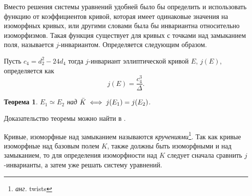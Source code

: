 \documentclass[12pt]{article}
\newtheorem{theorem}{Теорема}
\theoremstyle{definition}
\theoremstyle{definition}
\theoremstyle{definition}
\begin{document}
Вместо решения системы уравнений удобней было бы определить и использовать функцию от коэффициентов кривой, которая имеет одинаковые значения на изоморфных кривых, или другими словами была бы инвариантна относительно изоморфизмов. Такая функция существует для кривых с точками над замыканием поля, называется $j$-инвариантом. Определяется следующим образом.

Пусть $c_4 = d_2^2 - 24 d_4$ тогда $j$-инвариант эллиптической кривой $E$, $j(E)$, определяется как 
\[
j(E) = \frac{c_4^3}{\Delta}.
\]

\begin{theorem}
	$E_1 \simeq E_2$ над $\Bar{K} \iff j(E_1)=j(E_2)$.
\end{theorem}
Доказательство теоремы можно найти в \cite[46]{Silverman2009}.
%	
%	
%	
%	
%	

Кривые, изоморфные над замыканием называются \textit{кручениями}\footnote{\textit{анг.} twists}. Так как кривые изоморфные над базовым полем $K$, также должны быть изоморфными и над замыканием, то для определения изоморфности над $K$ следует сначала сравнить $j$-инварианты, а затем уже решать систему уравнений.
\end{document}

